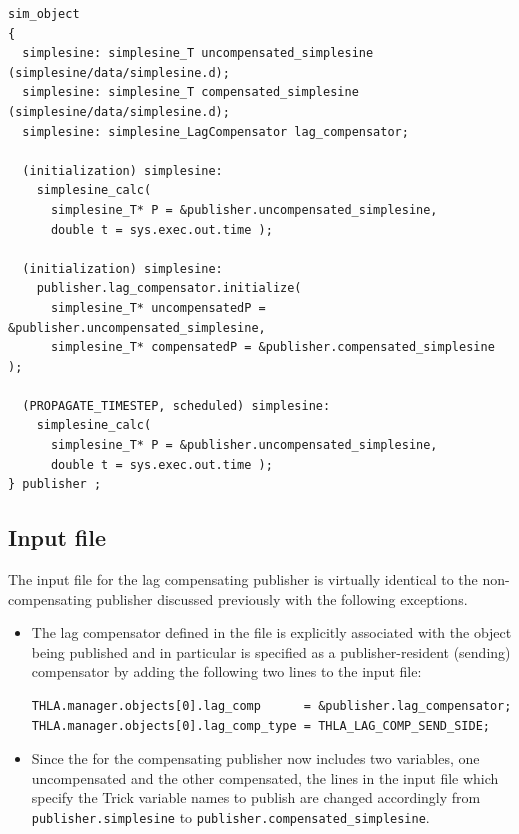 \begin{lstlisting}[caption={{\tt publisher} sim object for publisher-side lag compensation},label={list:pub-lag-sim-object}]
sim_object
{
  simplesine: simplesine_T uncompensated_simplesine (simplesine/data/simplesine.d);
  simplesine: simplesine_T compensated_simplesine (simplesine/data/simplesine.d);
  simplesine: simplesine_LagCompensator lag_compensator;

  (initialization) simplesine:
    simplesine_calc(
      simplesine_T* P = &publisher.uncompensated_simplesine,
      double t = sys.exec.out.time );

  (initialization) simplesine:
    publisher.lag_compensator.initialize(
      simplesine_T* uncompensatedP = &publisher.uncompensated_simplesine,
      simplesine_T* compensatedP = &publisher.compensated_simplesine );

  (PROPAGATE_TIMESTEP, scheduled) simplesine:
    simplesine_calc(
      simplesine_T* P = &publisher.uncompensated_simplesine,
      double t = sys.exec.out.time );
} publisher ;
\end{lstlisting}

\subsection{Input file}

The input file for the lag compensating publisher is virtually identical
to the non-compensating publisher discussed previously with the following
exceptions.
\begin{itemize}
\item{
  The lag compensator defined in the \sdefine file is explicitly
  associated with the object being published and in particular is
  specified as a publisher-resident (sending) compensator by adding
  the following two lines to the input file:
  \begin{verbatim}
THLA.manager.objects[0].lag_comp      = &publisher.lag_compensator;
THLA.manager.objects[0].lag_comp_type = THLA_LAG_COMP_SEND_SIDE;
  \end{verbatim}
}
\item{
  Since the \sdefine for the compensating publisher now includes
  two \simplesine variables,
  one uncompensated and the other compensated,
  the lines in the input file which specify the Trick variable names
  to publish are changed accordingly from
  {\tt publisher.simplesine} to
  {\tt publisher.compensated\_simplesine}.
}
\end{itemize}

